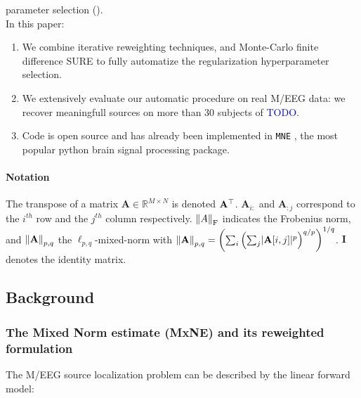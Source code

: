 parameter selection (\cite{Deledalle_Vaiter_Fadili_Peyre14}).
\\
In this paper:
%
\begin{enumerate}
    \item We combine iterative reweighting techniques, and Monte-Carlo finite difference SURE \citep{Ramani_Blu_Unser08,Deledalle_Vaiter_Fadili_Peyre14} to fully automatize the regularization hyperparameter selection.
    \item We extensively evaluate our automatic procedure on real M/EEG data: we recover meaningfull sources on more than 30 subjects of \textcolor{blue}{TODO}.
    \item Code is open source and has already been implemented in \texttt{MNE} \citep{mne}, the most popular python brain signal processing package.
\end{enumerate}
%
%
\paragraph{Notation} The transpose of a matrix $\mathbf{A} \in \mathbb{R}^{M \times N}$ is
denoted $\bf{A}^\top$. $\mathbf{A}_{i:}$ and $\mathbf{A}_{:j}$ correspond to the $i^{th}$
row and the $j^{th}$ column respectively. $\left \lVert A \right \rVert_{\text{F}}$ indicates the Frobenius norm,
and $\left \lVert \mathbf{A} \right \rVert_{p,q}$ the $\ell_{p,q}$-mixed-norm with $\left \lVert \mathbf{A} \right \rVert_{p,q}
= \left(\sum_i \left(\sum_j \lvert \mathbf{A}[i,j] \rvert^p\right)^{q/p}\right)^{1/q}$.
$\mathbf{I}$ denotes the identity matrix.


\subsection{Background}
\label{sub:background}
%

\subsubsection{The Mixed Norm estimate (MxNE) and its reweighted formulation}

The M/EEG source localization problem can be described by the linear forward model:

